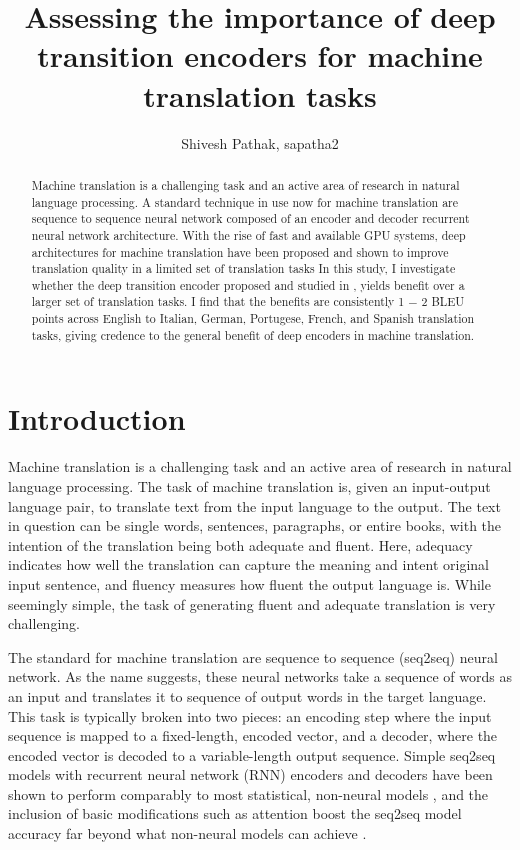 \documentclass[twocolumn,superscriptaddress]{revtex4-1}
\begin{document}
\title{Assessing the importance of deep transition encoders for machine translation tasks}
\begin{abstract}
Machine translation is a challenging task and an active area of research in natural language processing.
A standard technique in use now for machine translation are sequence to sequence neural network composed of an encoder and decoder recurrent neural network architecture.
With the rise of fast and available GPU systems, deep architectures for machine translation have been proposed and shown to improve translation quality in a limited set of translation tasks \cite{DBLP:journals/corr/ChoMBB14, miceli-barone-etal-2017-deep}
In this study, I investigate whether the deep transition encoder proposed and studied in \cite{miceli-barone-etal-2017-deep}, yields benefit over a larger set of translation tasks.
I find that the benefits are consistently 1 $-$ 2 BLEU points across English to Italian, German, Portugese, French, and Spanish translation tasks, giving credence to the general benefit of deep encoders in machine translation. 
\end{abstract}
\author{Shivesh Pathak, sapatha2}
\maketitle

\section{Introduction}
Machine translation is a challenging task and an active area of research in natural language processing.
The task of machine translation is, given an input-output language pair, to translate text from the input language to the output.
The text in question can be single words, sentences, paragraphs, or entire books, with the intention of the translation being both adequate and fluent.
Here, adequacy indicates how well the translation can capture the meaning and intent original input sentence, and fluency measures how fluent the output language is.
While seemingly simple, the task of generating fluent and adequate translation is very challenging.

The standard for machine translation are sequence to sequence (seq2seq) neural network.
As the name suggests, these neural networks take a sequence of words as an input and translates it to sequence of output words in the target language.
This task is typically broken into two pieces: an encoding step where the input sequence is mapped to a fixed-length, encoded vector, and a decoder, where the encoded vector is decoded to a variable-length output sequence.
Simple seq2seq models with recurrent neural network (RNN) encoders and decoders have been shown to perform comparably to most statistical, non-neural models \cite{DBLP:journals/corr/ChoMBB14}, and the inclusion of basic modifications such as attention boost the seq2seq model accuracy far beyond what non-neural models can achieve \cite{bahdanau2016neural}.
\end{document}
